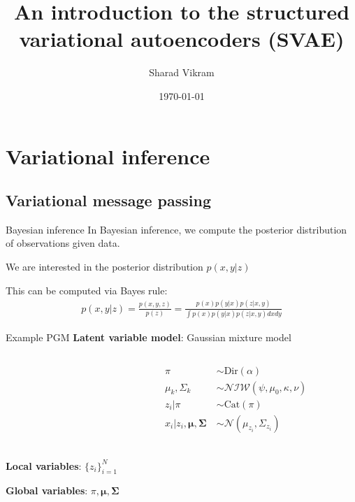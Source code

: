 \documentclass[10pt, compress]{beamer}
\title{An introduction to the structured variational autoencoders (SVAE)}
\subtitle{}
\date{\today}
\author{Sharad Vikram}
\institute{UCSD}
\begin{document}
\begin{frame}
  \titlepage
\end{frame}

\section{Variational inference}

\subsection{Variational message passing}

\begin{frame}{Bayesian inference}
  In Bayesian inference, we compute the posterior
  distribution of observations given data.

  \pause

    \begin{center}
      
    \end{center}
  \pause
  We are interested in the posterior distribution $p(x, y | z)$

  \pause
  This can be computed via Bayes rule:
  \begin{align*}
    p(x, y | z) = \frac{p(x, y, z)}{p(z)} = \frac{p(x)p(y | x)p(z | x, y)}{\int p(x)p(y | x)p(z | x, y)dx dy}
  \end{align*}
\end{frame}

\begin{frame}{Example PGM}
  \textbf{Latent variable model}: Gaussian mixture model
  \begin{columns}
    \begin{column}{0.5\textwidth}
      \begin{center}
        
      \end{center}
    \end{column}
    \begin{column}{0.5\textwidth}
      \begin{align*}
        \pi &\sim \textrm{Dir}(\alpha) \\
        \mu_k, \Sigma_k &\sim \mathcal{NIW}(\psi, \mu_0, \kappa, \nu) \\
        z_i | \pi &\sim \textrm{Cat}(\pi) \\
        x_i | z_i, \bm{\mu}, \bm{\Sigma} \ &\sim \mathcal{N}(\mu_{z_i}, \Sigma_{z_i}) \\
      \end{align*}
    \end{column}
  \end{columns}

  \pause
  \textbf{Local variables}: $\{z_i\}_{i=1}^N$

  \pause
  \textbf{Global variables}: $\pi, \bm{\mu}, \bm{\Sigma}$
\end{frame}
\end{document}
